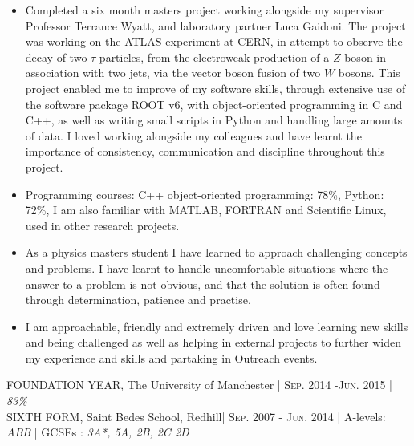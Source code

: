 \documentclass[a4paper,10pt]{article}
\begin{document}
\begin{itemize}[leftmargin=*,topsep=0pt,noitemsep,parsep=0pt,partopsep=0pt,rightmargin=0.5cm]

    \item Completed a six month masters project working alongside my supervisor Professor Terrance Wyatt, and laboratory partner Luca Gaidoni. The project was working on the ATLAS experiment at CERN, in attempt to observe the  decay of two $\tau$ particles, from the electroweak production of a $Z$ boson in association with two jets, via the vector boson fusion of two $W$ bosons. This project enabled me to improve of my software skills, through extensive use of the software package ROOT v6, with object-oriented programming in C and C++, as well as writing small scripts in Python and handling large amounts of data. I loved working alongside my colleagues and have learnt the importance of consistency, communication and discipline throughout this project. 
    
    \item Programming courses: C++ object-oriented programming: 78\%, Python: 72\%, I am also familiar with MATLAB, FORTRAN and Scientific Linux, used in other research projects.
    
    \item As a physics masters student I have learned to approach challenging concepts and problems. I have learnt to handle uncomfortable situations where the answer to a problem is not obvious, and that the solution is often found through determination, patience and practise.
    
    \item I am approachable, friendly and extremely driven and love learning new skills and being challenged as well as helping in external projects to further widen my experience and skills and partaking in Outreach events.
    
\end{itemize}

    FOUNDATION YEAR, The University of Manchester | \textsc{Sep.} 2014 -\textsc{Jun}. 2015 | \small\emph{83\%}\\
    SIXTH FORM, Saint Bedes School, Redhill|  \textsc{Sep.} 2007 - \textsc{Jun}. 2014 | {A-levels: \emph{ABB}} | {GCSEs : \emph{3A*, 5A, 2B, 2C 2D}}
    
\end{document}
